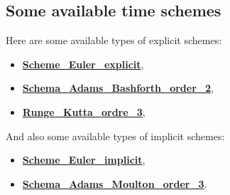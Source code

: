 \subsection{Some available time schemes}
Here are some available types of explicit schemes:
\begin{itemize}
\item \href{../../Outils/TRIOXDATA/XTriou/doc.pdf\#eulerscheme}{\textbf{Scheme\_Euler\_explicit}},
\item \href{../../Outils/TRIOXDATA/XTriou/doc.pdf\#schemaadamsbashforthorder2}{\textbf{Schema\_Adams\_Bashforth\_order\_2}},
\item \href{../../Outils/TRIOXDATA/XTriou/doc.pdf\#rungekuttaordre3}{\textbf{Runge\_Kutta\_ordre\_3}},
\end{itemize}

And also some available types of implicit schemes:
\begin{itemize}
\item \href{../../Outils/TRIOXDATA/XTriou/doc.pdf\#schemaeulerimplicite}{\textbf{Scheme\_Euler\_implicit}},
\item \href{../../Outils/TRIOXDATA/XTriou/doc.pdf\#schemaadamsmoultonorder3}{\textbf{Schema\_Adams\_Moulton\_order\_3}}.
\end{itemize}


